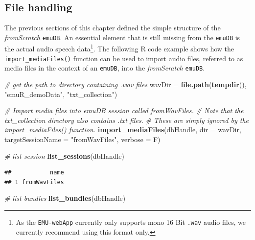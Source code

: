 \documentclass[]{book}
\newenvironment{Shaded}{\begin{snugshade}}{\end{snugshade}}
\newcommand{\CommentTok}[1]{\textcolor[rgb]{0.56,0.35,0.01}{\textit{#1}}}
\newcommand{\DataTypeTok}[1]{\textcolor[rgb]{0.13,0.29,0.53}{#1}}
\newcommand{\KeywordTok}[1]{\textcolor[rgb]{0.13,0.29,0.53}{\textbf{#1}}}
\newcommand{\NormalTok}[1]{#1}
\newcommand{\StringTok}[1]{\textcolor[rgb]{0.31,0.60,0.02}{#1}}
\let\rmarkdownfootnote\footnote%
\def\footnote{\protect\rmarkdownfootnote}
\theoremstyle{definition}
\theoremstyle{definition}
\theoremstyle{definition}
\theoremstyle{remark}
\begin{document}
\hypertarget{file-handling}{%
\subsection{File handling}\label{file-handling}}

The previous sections of this chapter defined the simple structure of
the \emph{fromScratch} \texttt{emuDB}. An essential element that is
still missing from the \texttt{emuDB} is the actual audio speech
data\footnote{As the \texttt{EMU-webApp} currently only supports mono 16
  Bit \texttt{.wav} audio files, we currently recommend using this
  format only.}. The following R code example shows how the
\texttt{import\_mediaFiles()} function can be used to import audio
files, referred to as media files in the context of an \texttt{emuDB},
into the \emph{fromScratch} \texttt{emuDB}.

\begin{Shaded}
\begin{Highlighting}[]
\CommentTok{# get the path to directory containing .wav files}
\NormalTok{wavDir =}\StringTok{ }\KeywordTok{file.path}\NormalTok{(}\KeywordTok{tempdir}\NormalTok{(), }\StringTok{"emuR_demoData"}\NormalTok{, }\StringTok{"txt_collection"}\NormalTok{)}

\CommentTok{# Import media files into emuDB session called fromWavFiles.}
\CommentTok{# Note that the txt_collection directory also contains .txt files.}
\CommentTok{# These are simply ignored by the import_mediaFiles() function.}
\KeywordTok{import_mediaFiles}\NormalTok{(dbHandle,}
                  \DataTypeTok{dir =}\NormalTok{ wavDir,}
                  \DataTypeTok{targetSessionName =} \StringTok{"fromWavFiles"}\NormalTok{,}
                  \DataTypeTok{verbose =}\NormalTok{ F)}

\CommentTok{# list session}
\KeywordTok{list_sessions}\NormalTok{(dbHandle)}
\end{Highlighting}
\end{Shaded}

\begin{verbatim}
##           name
## 1 fromWavFiles
\end{verbatim}

\begin{Shaded}
\begin{Highlighting}[]
\CommentTok{# list bundles}
\KeywordTok{list_bundles}\NormalTok{(dbHandle)}
\end{Highlighting}
\end{Shaded}
\end{document}
